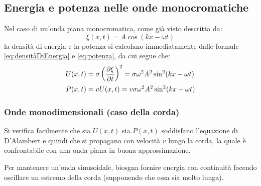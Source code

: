 \documentclass[11pt, a4paper, openright]{book}
\theoremstyle{plain}
\theoremstyle{definition}
\begin{document}
\subsection{Energia e potenza nelle onde monocromatiche}
Nel caso di un'onda piana monocromatica, come già visto descritta da:
\begin{equation}
    \xi(x, t) = A\cos(kx - \omega t)
\end{equation} 
la densità di energia e la potenza si calcolano immediatamente dalle formule \ref{eq:densitàDiEnergia} e \ref{eq:potenza}, da cui segue che:
\begin{align}
    U(x, t) & = \sigma\left(\pdv{\xi}{t}\right)^2 = \sigma \omega^2 A^2 \sin^2(kx - \omega t) \\
    P(x, t) & = vU(x, t) = v\sigma \omega^2 A^2 \sin^2(kx - \omega t)
\end{align}

\subsubsection{Onde monodimensionali (caso della corda)}
Si verifica facilmente che sia $U(x, t)$ sia $P(x, t)$ soddisfano l'equazione di D'Alambert e quindi che si propagano con velocità $v$ lungo la corda, la quale è confrontabile con una onda piana in buona approssimazione.

Per mantenere un'onda sinusoidale, biosgna fornire energia con continuità facendo oscillare un estremo della corda (supponendo che essa sia molto lunga).
\end{document}
